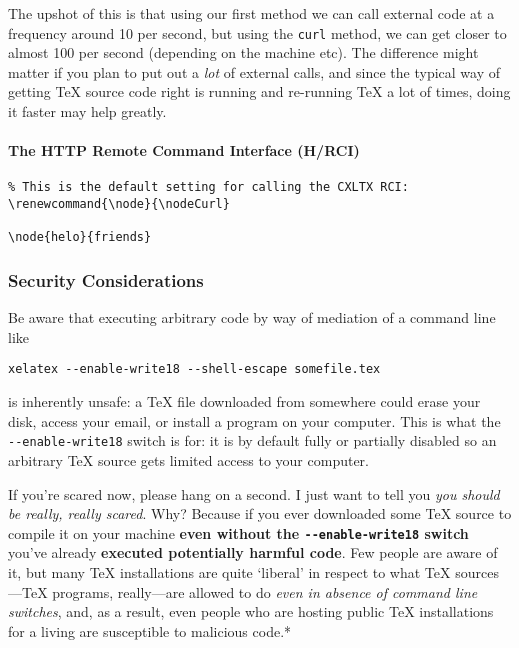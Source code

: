 The upshot of this is that using our first method we can call external
code at a frequency around 10 per second, but using the \texttt{curl}
method, we can get closer to almost 100 per second (depending on the
machine etc). The difference might matter if you plan to put out a
\emph{lot} of external calls, and since the typical way of getting TeX
source code right is running and re-running TeX a lot of times, doing it
faster may help greatly.

\paragraph{The HTTP Remote Command Interface
(H/RCI)}\label{the-http-remote-command-interface-hrci}

\begin{verbatim}
% This is the default setting for calling the CXLTX RCI:
\renewcommand{\node}{\nodeCurl}

\node{helo}{friends}
\end{verbatim}

\subsubsection{Security Considerations}\label{security-considerations}

Be aware that executing arbitrary code by way of mediation of a command
line like

\begin{verbatim}
xelatex --enable-write18 --shell-escape somefile.tex
\end{verbatim}

is inherently unsafe: a TeX file downloaded from somewhere could erase
your disk, access your email, or install a program on your computer.
This is what the \texttt{-{}-enable-write18} switch is for: it is by
default fully or partially disabled so an arbitrary TeX source gets
limited access to your computer.

If you're scared now, please hang on a second. I just want to tell you
\emph{you should be really, really scared}. Why? Because if you ever
downloaded some TeX source to compile it on your machine \textbf{even
without the \texttt{-{}-enable-write18} switch} you've already
\textbf{executed potentially harmful code}. Few people are aware of it,
but many TeX installations are quite `liberal' in respect to what TeX
sources---TeX programs, really---are allowed to do \emph{even in absence
of command line switches}, and, as a result, even people who are hosting
public TeX installations for a living are susceptible to malicious
code.*

